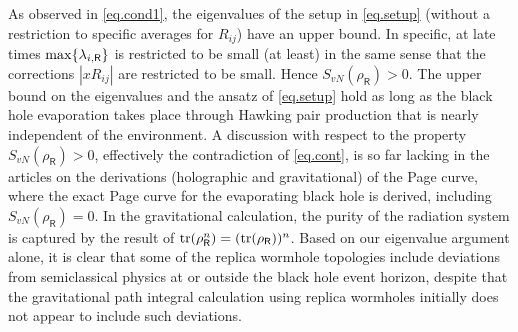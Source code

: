\documentclass[12pt]{article}
\numberwithin{equation}{section}
\begin{document}
As observed in \eqref{eq.cond1}, the eigenvalues of the setup in \eqref{eq.setup} (without a restriction to specific averages for $R_{ij}$) have an upper bound. In specific, at late times ${\rm max}\{\lambda_{i,\textsf{R}}\}$ is restricted to be small (at least) in the same sense that the corrections $|x R_{ij}|$ are restricted to be small. Hence $S_{vN}(\rho_\textsf{R})>0$. The upper bound on the eigenvalues and the ansatz of \eqref{eq.setup} hold as long as the black hole evaporation takes place through Hawking pair production that is nearly independent of the environment. A discussion with respect to the property $S_{vN}(\rho_\textsf{R})>0$, effectively the contradiction of \eqref{eq.cont}, is so far lacking in the articles on the derivations (holographic and gravitational) of the Page curve, where the exact Page curve for the evaporating black hole is derived, including $S_{vN}(\rho_\textsf{R})=0$. In the gravitational calculation, the purity of the radiation system is captured by the result of ${\rm tr}(\rho_\textsf{R}^n)=({\rm tr}(\rho_\textsf{R}))^n$. Based on our eigenvalue argument alone, it is clear that some of the replica wormhole topologies include deviations from semiclassical physics at or outside the black hole event horizon, despite that the gravitational path integral calculation using replica wormholes initially does not appear to include such deviations.
\end{document}
